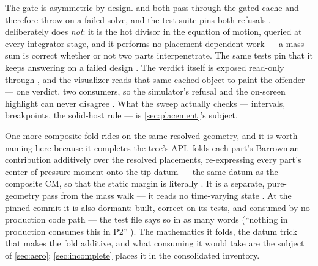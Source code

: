 \begin{designrule}
The gate is asymmetric by design.  and  both pass
through the gated cache and therefore throw on a failed solve, and the test suite pins both
refusals .  deliberately
does \emph{not}: it is the hot divisor in the equation of motion, queried at every integrator
stage, and it performs no placement-dependent work --- a mass sum is correct whether or not
two parts interpenetrate. The same tests pin that it keeps answering on a failed design
. The verdict itself is exposed read-only
through  , and the visualizer reads
that same cached object to paint the offender  --- one
verdict, two consumers, so the simulator's refusal and the on-screen highlight can never
disagree . What the sweep actually checks --- intervals,
breakpoints, the solid-host rule --- is \cref{sec:placement}'s subject.
\end{designrule}

One more composite fold rides on the same resolved geometry, and it is worth naming here
because it completes the tree's API.  folds each part's
Barrowman contribution additively over the resolved placements, re-expressing every part's
center-of-pressure moment onto the tip datum --- the same datum as the composite CM, so that
the static margin is literally  . It is a
separate, pure-geometry pass from the mass walk --- it reads no time-varying state
. At the pinned commit it is also dormant: built, correct on its
tests, and consumed by no production code path --- the test file says so in as many words
(``nothing in production consumes this in P2'' ). The
mathematics it folds, the datum trick that makes the fold additive, and what consuming it
would take are the subject of \cref{sec:aero}; \cref{sec:incomplete} places it in the
consolidated inventory.

